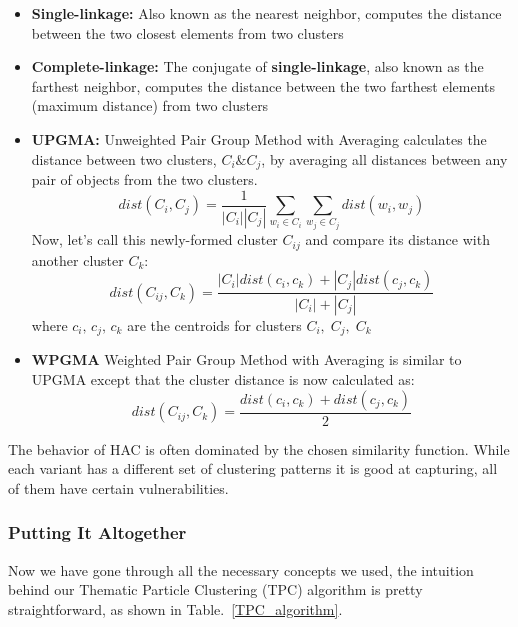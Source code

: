 \documentclass[conference]{IEEEtran}
\begin{document}
\begin{itemize}
	\item \textbf{Single-linkage:} Also known as the nearest neighbor, computes the distance between the two closest elements from two clusters
	\item \textbf{Complete-linkage:} The conjugate of \textbf{single-linkage}, also known as the farthest neighbor, computes the distance between the two farthest elements (maximum distance) from two clusters
	\item \textbf{UPGMA: } Unweighted Pair Group Method with Averaging calculates the distance between two clusters, $C_i \& C_j$, by averaging all distances between any pair of objects from the two clusters.
	\begin{equation*}
		dist(C_i, C_j) = \frac{1}{|C_i||C_j|}\sum_{w_i \in C_i}\sum_{w_j \in C_j}dist(w_i, w_j)
	\end{equation*}
	Now, let's call this newly-formed cluster $C_{ij}$ and compare its distance with another cluster $C_k$:
	\begin{equation*}
		dist(C_{ij}, C_k) =  \frac{|C_i|dist(c_i,c_k) + |C_j|dist(c_j,c_k)}{|C_i|+|C_j|}
	\end{equation*}
	where $c_i,\,c_j,\,c_k$ are the centroids for clusters $C_i,\;C_j,\;C_k$
	\item \textbf{WPGMA} Weighted Pair Group Method with Averaging is similar to UPGMA except that the cluster distance is now calculated as:
	\begin{equation*}
		dist(C_{ij}, C_k) =  \frac{dist(c_i,c_k) + dist(c_j,c_k)}{2}
	\end{equation*}
\end{itemize}

 The behavior of HAC is often dominated by the chosen similarity function. While each variant has a different set of clustering patterns it is good at capturing, all of them have certain vulnerabilities. 

\subsubsection{Putting It Altogether}

Now we have gone through all the necessary concepts we used, the intuition behind our Thematic Particle Clustering (TPC) algorithm is pretty straightforward, as shown in Table.~\ref{TPC_algorithm}.
\end{document}
